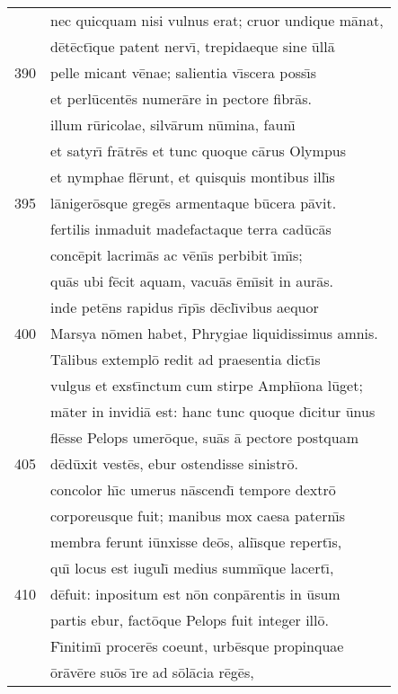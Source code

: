 \documentclass[paper=6in:9in,pagesize=pdftex,
               headinclude=on,footinclude=on,12pt]{scrbook}
\begin{document}
\begin{longtable}[p]{ r l }
 & nec quicquam nisi vulnus erat; cruor undique m\=anat,\\ 
 & d\=et\=ect\={\i}que patent nerv\={\i}, trepidaeque sine \=ull\=a\\ 
390 & pelle micant v\=enae; salientia v\={\i}scera poss\={\i}s\\ 
 & et perl\=ucent\=es numer\=are in pectore fibr\=as.\\ 
 & illum r\=uricolae, silv\=arum n\=umina, faun\={\i}\\ 
 & et satyr\={\i} fr\=atr\=es et tunc quoque c\=arus Olympus\\ 
 & et nymphae fl\=erunt, et quisquis montibus ill\={\i}s\\ 
395 & l\=aniger\=osque greg\=es armentaque b\=ucera p\=avit.\\ 
 & fertilis inmaduit madefactaque terra cad\=uc\=as\\ 
 & conc\=epit lacrim\=as ac v\=en\={\i}s perbibit \={\i}m\={\i}s;\\ 
 & qu\=as ubi f\=ecit aquam, vacu\=as \=em\={\i}sit in aur\=as.\\ 
 & inde pet\=ens rapidus r\={\i}p\={\i}s d\=ecl\={\i}vibus aequor\\ 
400 & Marsya n\=omen habet, Phrygiae liquidissimus amnis.\\ 
 & \indent T\=alibus extempl\=o redit ad praesentia dict\={\i}s\\ 
 & vulgus et exst\={\i}nctum cum stirpe Amph\={\i}ona l\=uget;\\ 
 & m\=ater in invidi\=a est: hanc tunc quoque d\={\i}citur \=unus\\ 
 & fl\=esse Pelops umer\=oque, su\=as \=a pectore postquam\\ 
405 & d\=ed\=uxit vest\=es, ebur ostendisse sinistr\=o.\\ 
 & concolor h\={\i}c umerus n\=ascend\={\i} tempore dextr\=o\\ 
 & corporeusque fuit; manibus mox caesa patern\={\i}s\\ 
 & membra ferunt i\=unxisse de\=os, ali\={\i}sque repert\={\i}s,\\ 
 & qu\={\i} locus est iugul\={\i} medius summ\={\i}que lacert\={\i},\\ 
410 & d\=efuit: inpositum est n\=on conp\=arentis in \=usum\\ 
 & partis ebur, fact\=oque Pelops fuit integer ill\=o.\\ 
 & \indent F\={\i}nitim\={\i} procer\=es coeunt, urb\=esque propinquae\\ 
 & \=or\=av\=ere su\=os \={\i}re ad s\=ol\=acia r\=eg\=es,\\ 

\end{longtable}
\end{document}
